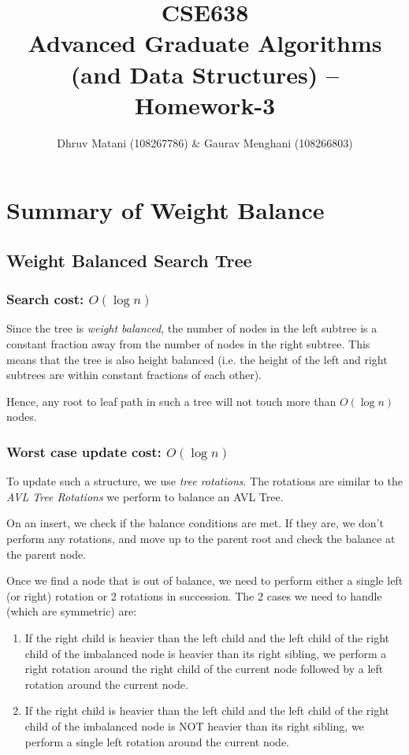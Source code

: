 \documentclass{article}
\title{CSE638 \\ Advanced Graduate Algorithms (and Data Structures) -- Homework-3}
\author{Dhruv Matani (108267786) \& Gaurav Menghani (108266803)}
\begin{document}
\maketitle

\clearpage

\tableofcontents

\clearpage

\section{Summary of Weight Balance}

\subsection{Weight Balanced Search Tree}

\subsubsection{Search cost: $O(\log{n})$}

Since the tree is \textit{weight balanced}, the number of nodes in the
left subtree is a constant fraction away from the number of nodes in
the right subtree. This means that the tree is also height balanced
(i.e. the height of the left and right subtrees are within constant
fractions of each other).

Hence, any root to leaf path in such a tree will not touch more than
$O(\log{n})$ nodes.

\subsubsection{Worst case update cost: $O(\log{n})$}

To update such a structure, we use \textit{tree rotations}. The
rotations are similar to the \textit{AVL Tree Rotations} we perform to
balance an AVL Tree.

On an insert, we check if the balance conditions are met. If they are,
we don't perform any rotations, and move up to the parent root and
check the balance at the parent node.

Once we find a node that is out of balance, we need to perform either
a single left (or right) rotation or 2 rotations in succession. The 2
cases we need to handle (which are symmetric) are:

\begin{enumerate}
\item If the right child is heavier than the left child and the left
  child of the right child of the imbalanced node is heavier than its
  right sibling, we perform a right rotation around the right child of
  the current node followed by a left rotation around the current
  node.

\item If the right child is heavier than the left child and the left
  child of the right child of the imbalanced node is NOT heavier than its
  right sibling, we perform a single left rotation around the current
  node.

\end{enumerate}
\end{document}

